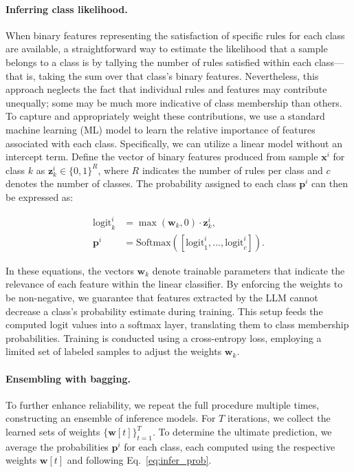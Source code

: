 \paragraph{Inferring class likelihood.} When binary features representing the satisfaction of specific rules for each class are available, a straightforward way to estimate the likelihood that a sample belongs to a class is by tallying the number of rules satisfied within each class—that is, taking the sum over that class's binary features. Nevertheless, this approach neglects the fact that individual rules and features may contribute unequally; some may be much more indicative of class membership than others. To capture and appropriately weight these contributions, we use a standard machine learning (ML) model to learn the relative importance of features associated with each class. Specifically, we can utilize a linear model without an intercept term. Define the vector of binary features produced from sample $\mathbf{x}^i$ for class $k$ as $\mathbf{z}_k^i \in \{0, 1\}^R$, where $R$ indicates the number of rules per class and $c$ denotes the number of classes. The probability assigned to each class $\mathbf{p}^i$ can then be expressed as:

\begin{align}
\text{logit}_k^i &= \max(\mathbf{w}_k, 0) \cdot \mathbf{z}_k^i, \nonumber \\
\mathbf{p}^i &= \text{Softmax}({[\text{logit}_{1}^i, ..., \text{logit}_{c}^i]}). \label{eq:infer_prob}
\end{align}

In these equations, the vectors $\mathbf{w}_k$ denote trainable parameters that indicate the relevance of each feature within the linear classifier. By enforcing the weights to be non-negative, we guarantee that features extracted by the LLM cannot decrease a class's probability estimate during training. This setup feeds the computed logit values into a softmax layer, translating them to class membership probabilities. Training is conducted using a cross-entropy loss, employing a limited set of labeled samples to adjust the weights $\mathbf{w}_k$.

\vspace*{-0.12in}
\paragraph{Ensembling with bagging.} To further enhance reliability, we repeat the full procedure multiple times, constructing an ensemble of inference models. For $T$ iterations, we collect the learned sets of weights $\{\mathbf{w}[t]\}_{t=1}^T$. To determine the ultimate prediction, we average the probabilities $\mathbf{p}^i$ for each class, each computed using the respective weights $\mathbf{w}[t]$ and following Eq.~\ref{eq:infer_prob}.

